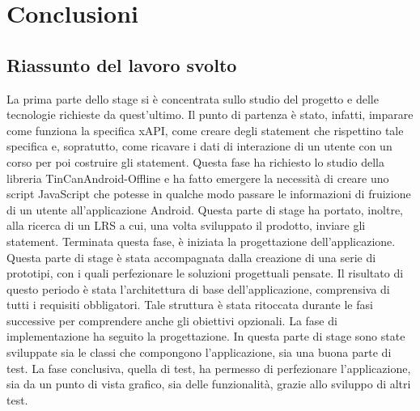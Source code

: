 \documentclass[../Tesi.tex]{subfiles}
\begin{document}
\section{Conclusioni}\label{sec:conclusioni}
	\subsection{Riassunto del lavoro svolto}
	La prima parte dello stage si è concentrata sullo studio del progetto e delle tecnologie richieste da quest'ultimo. Il punto di partenza è stato, infatti, imparare come funziona la specifica xAPI, come creare degli statement che rispettino tale specifica e, sopratutto, come ricavare i dati di interazione di un utente con un corso per poi costruire gli statement. Questa fase ha richiesto lo studio della libreria TinCanAndroid-Offline e ha fatto emergere la necessità di creare uno script JavaScript che potesse in qualche modo passare le informazioni di fruizione di un utente all'applicazione Android. Questa parte di stage ha portato, inoltre, alla ricerca di un LRS a cui, una volta sviluppato il prodotto, inviare gli statement. Terminata questa fase, è iniziata la progettazione dell'applicazione. Questa parte di stage è stata accompagnata dalla creazione di una serie di prototipi, con i quali perfezionare le soluzioni progettuali pensate. Il risultato di questo periodo è stata l'architettura di base dell'applicazione, comprensiva di tutti i requisiti obbligatori. Tale struttura è stata ritoccata durante le fasi successive per comprendere anche gli obiettivi opzionali. La fase di implementazione ha seguito la progettazione. In questa parte di stage sono state sviluppate sia le classi che compongono l'applicazione, sia una buona parte di test. La fase conclusiva, quella di test, ha permesso di perfezionare l'applicazione, sia da un punto di vista grafico, sia delle funzionalità, grazie allo sviluppo di altri test.\\
\end{document}
